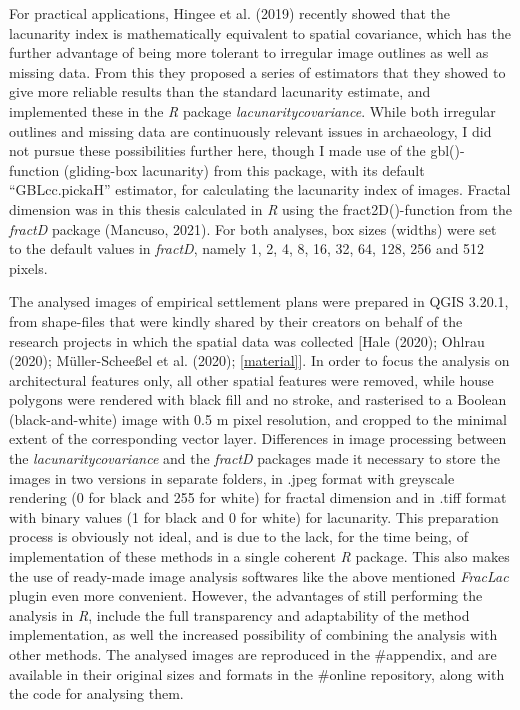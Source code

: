 \documentclass[
  12pt,
]{book}
\begin{document}
For practical applications, Hingee et al. (2019) recently showed that the lacunarity index is mathematically equivalent to spatial covariance, which has the further advantage of being more tolerant to irregular image outlines as well as missing data. From this they proposed a series of estimators that they showed to give more reliable results than the standard lacunarity estimate, and implemented these in the \emph{R} package \emph{lacunaritycovariance}. While both irregular outlines and missing data are continuously relevant issues in archaeology, I did not pursue these possibilities further here, though I made use of the gbl()-function (gliding-box lacunarity) from this package, with its default ``GBLcc.pickaH'' estimator, for calculating the lacunarity index of images. Fractal dimension was in this thesis calculated in \emph{R} using the fract2D()-function from the \emph{fractD} package (Mancuso, 2021). For both analyses, box sizes (widths) were set to the default values in \emph{fractD}, namely 1, 2, 4, 8, 16, 32, 64, 128, 256 and 512 pixels.

The analysed images of empirical settlement plans were prepared in QGIS 3.20.1, from shape-files that were kindly shared by their creators on behalf of the research projects in which the spatial data was collected {[}Hale (2020); Ohlrau (2020); Müller-Scheeßel et al. (2020); \ref{material}{]}. In order to focus the analysis on architectural features only, all other spatial features were removed, while house polygons were rendered with black fill and no stroke, and rasterised to a Boolean (black-and-white) image with 0.5 m pixel resolution, and cropped to the minimal extent of the corresponding vector layer. Differences in image processing between the \emph{lacunaritycovariance} and the \emph{fractD} packages made it necessary to store the images in two versions in separate folders, in .jpeg format with greyscale rendering (0 for black and 255 for white) for fractal dimension and in .tiff format with binary values (1 for black and 0 for white) for lacunarity. This preparation process is obviously not ideal, and is due to the lack, for the time being, of implementation of these methods in a single coherent \emph{R} package. This also makes the use of ready-made image analysis softwares like the above mentioned \emph{FracLac} plugin even more convenient. However, the advantages of still performing the analysis in \emph{R}, include the full transparency and adaptability of the method implementation, as well the increased possibility of combining the analysis with other methods. The analysed images are reproduced in the \#appendix, and are available in their original sizes and formats in the \#online repository, along with the code for analysing them.
\end{document}
